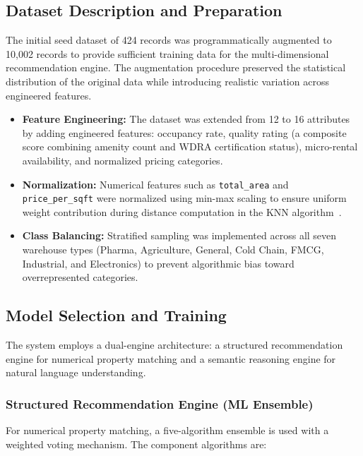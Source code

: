 \documentclass[pdflatex,sn-mathphys-num]{sn-jnl}
\theoremstyle{thmstyleone}
\theoremstyle{thmstyletwo}
\theoremstyle{thmstylethree}
\begin{document}
\subsection{Dataset Description and Preparation}\label{subsec:dataset}

The initial seed dataset of 424 records was programmatically augmented to 10,002 records to provide sufficient training data for the multi-dimensional recommendation engine. The augmentation procedure preserved the statistical distribution of the original data while introducing realistic variation across engineered features.

\begin{itemize}
    \item \textbf{Feature Engineering:} The dataset was extended from 12 to 16 attributes by adding engineered features: occupancy rate, quality rating (a composite score combining amenity count and WDRA certification status), micro-rental availability, and normalized pricing categories.

    \item \textbf{Normalization:} Numerical features such as \texttt{total\_area} and \texttt{price\_per\_sqft} were normalized using min-max scaling to ensure uniform weight contribution during distance computation in the KNN algorithm~\cite{b11}.

    \item \textbf{Class Balancing:} Stratified sampling was implemented across all seven warehouse types (Pharma, Agriculture, General, Cold Chain, FMCG, Industrial, and Electronics) to prevent algorithmic bias toward overrepresented categories.
\end{itemize}

\subsection{Model Selection and Training}\label{subsec:model}

The system employs a dual-engine architecture: a structured recommendation engine for numerical property matching and a semantic reasoning engine for natural language understanding.

\subsubsection{Structured Recommendation Engine (ML Ensemble)}\label{subsubsec:ensemble}

For numerical property matching, a five-algorithm ensemble is used with a weighted voting mechanism. The component algorithms are:
\end{document}
